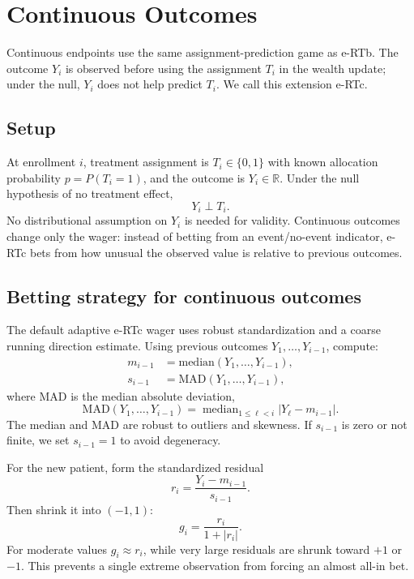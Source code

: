 \documentclass[10pt]{article}
\begin{document}
\section{Continuous Outcomes}

Continuous endpoints use the same assignment-prediction game as e-RTb. The outcome $Y_i$ is observed before using the assignment $T_i$ in the wealth update; under the null, $Y_i$ does not help predict $T_i$. We call this extension e-RTc.

\subsection{Setup}

At enrollment $i$, treatment assignment is $T_i \in \{0,1\}$ with known allocation probability $p=P(T_i=1)$, and the outcome is $Y_i \in \mathbb{R}$. Under the null hypothesis of no treatment effect,
\begin{equation}
Y_i \perp T_i.
\end{equation}
No distributional assumption on $Y_i$ is needed for validity. Continuous outcomes change only the wager: instead of betting from an event/no-event indicator, e-RTc bets from how unusual the observed value is relative to previous outcomes.

\subsection{Betting strategy for continuous outcomes}

The default adaptive e-RTc wager uses robust standardization and a coarse running direction estimate. Using previous outcomes $Y_1, \dots, Y_{i-1}$, compute:
\begin{align}
m_{i-1} &= \text{median}(Y_1, \dots, Y_{i-1}), \\
s_{i-1} &= \text{MAD}(Y_1, \dots, Y_{i-1}) ,
\end{align}
where MAD is the median absolute deviation,
\begin{equation}
\mathrm{MAD}(Y_1,\ldots,Y_{i-1})
= \operatorname{median}_{1 \leq \ell < i}\left|Y_\ell - m_{i-1}\right|.
\end{equation}
The median and MAD are robust to outliers and skewness. If $s_{i-1}$ is zero or not finite, we set $s_{i-1} = 1$ to avoid degeneracy.

For the new patient, form the standardized residual
\begin{equation}
r_i = \frac{Y_i - m_{i-1}}{s_{i-1}}.
\end{equation}
Then shrink it into $(-1,1)$:
$$
g_i = \frac{r_i}{1 + |r_i|}.
$$
For moderate values $g_i \approx r_i$, while very large residuals are shrunk toward $+1$ or $-1$. This prevents a single extreme observation from forcing an almost all-in bet.
\end{document}
